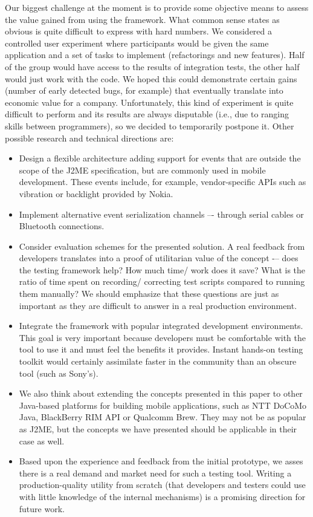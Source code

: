 Our biggest challenge at the moment is to provide some objective means to
assess the value gained from using the framework. What common sense states
as obvious is quite difficult to express with hard numbers. We considered a controlled
user experiment where participants would be given the same application
and a set of tasks to implement (refactorings and new features). Half of the
group would have access to the results of integration tests, the other half would
just work with the code. We hoped this could demonstrate certain gains (number
of early detected bugs, for example) that eventually translate into economic
value for a company. Unfortunately, this kind of experiment is quite difficult to
perform and its results are always disputable (i.e., due to ranging skills between
programmers), so we decided to temporarily postpone it. Other possible research
and technical directions are:
\begin{itemize}
    \item Design a flexible architecture adding support for events that are outside
the scope of the J2ME specification, but are commonly used in mobile development.
These events include, for example, vendor-specific APIs such as
vibration or backlight provided by Nokia.
    \item Implement alternative event serialization channels –- through serial cables or
Bluetooth connections.
    \item Consider evaluation schemes for the presented solution. A real feedback from
developers translates into a proof of utilitarian value of the concept -– does
the testing framework help? How much time/ work does it save? What is
the ratio of time spent on recording/ correcting test scripts compared to
running them manually? We should emphasize that these questions are just
as important as they are difficult to answer in a real production environment.
    \item Integrate the framework with popular integrated development environments.
This goal is very important because developers must be comfortable with the
tool to use it and must feel the benefits it provides. Instant hands-on testing
toolkit would certainly assimilate faster in the community than an obscure
tool (such as Sony’s).
    \item We also think about extending the concepts presented in this paper to other
Java-based platforms for building mobile applications, such as NTT DoCoMo
Java, BlackBerry RIM API or Qualcomm Brew. They may not be as popular
as J2ME, but the concepts we have presented should be applicable in their
case as well.
    \item Based upon the experience and feedback from the initial prototype, we asses there is a real demand
    and market need for such a testing tool. Writing a production-quality utility from
    scratch (that developers and testers could use with little knowledge of the internal mechanisms) 
    is a promising direction  for future work.
\end{itemize}
